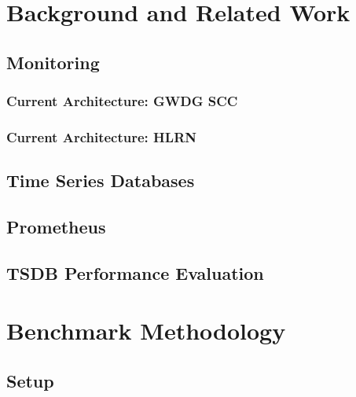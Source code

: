 \section{Background and Related Work}
\subsection{Monitoring}
\subsubsection{Current Architecture: GWDG SCC}
\subsubsection{Current Architecture: HLRN}
\subsection{Time Series Databases}
\subsection{Prometheus}
\subsection{TSDB Performance Evaluation}

\section{Benchmark Methodology}
\subsection{Setup}
